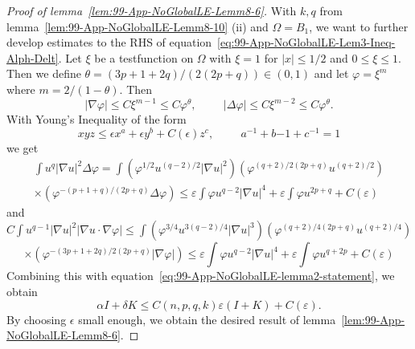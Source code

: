 \begin{proof}[Proof of lemma~\ref{lem:99-App-NoGlobalLE-Lemm8-6}]
	With $k,q$ from lemma~\ref{lem:99-App-NoGlobalLE-Lemm8-10} (ii) and $\Omega=B_1$, we want to further develop estimates to the RHS of equation~\eqref{eq:99-App-NoGlobalLE-Lem3-Ineq-Alph-Delt}.
	Let $\xi$ be a testfunction on $\Omega$ with $\xi=1$ for $|x|\leq 1/2$ and $0\leq\xi\leq1$. Then we define $\theta=(3p+1+2q)/(2(2p+q))\in(0,1)$ and let $\varphi=\xi^m$ where $m=2/(1-\theta)$. Then
	\begin{equation}
		\left|\nabla\varphi\right|\leq C\xi^{m-1}\leq C\varphi^{\theta},\hspace{1cm}|\Delta\varphi|\leq C\xi^{m-2}\leq C\varphi^{\theta}.
		\label{eq:99-App-NoGlobalLE-Lem4-Proof-i}
	\end{equation}
	With Young's Inequality of the form
	\begin{equation}
		xyz\leq\epsilon x^a+\epsilon y^b+ C(\epsilon)z^c,\hspace{1cm}a^{-1}+b{-1}+c^{-1}=1
		\label{eq:99-App-NoGlobalLE-Lem4-Proof-ii}
	\end{equation}
	we get
	\begin{equation}
		\begin{gathered}
		\int u^{q}|\nabla u|^{2} \Delta \varphi=\int\left(\varphi^{1 / 2} u^{(q-2) / 2}|\nabla u|^{2}\right)\left(\varphi^{(q+2) / 2(2 p+q)} u^{(q+2) / 2}\right) \\
		\times\left(\varphi^{-(p+1+q) /(2 p+q)} \Delta \varphi\right) \leq \varepsilon \int \varphi u^{q-2}|\nabla u|^{4}+\varepsilon \int \varphi u^{2 p+q}+C(\varepsilon)
		\end{gathered}
		\label{eq:99-App-NoGlobalLE-Lem4-Proofiii-1}
	\end{equation}
	and
	$C \int u^{q-1}|\nabla u|^{2}|\nabla u \cdot \nabla \varphi| \leq \int\left(\varphi^{3 / 4} u^{3(q-2) / 4}|\nabla u|^{3}\right)\left(\varphi^{(q+2) / 4(2 p+q)} u^{(q+2) / 4}\right)$
	\begin{equation}
	\times\left(\varphi^{-(3 p+1+2 q) / 2(2 p+q)}|\nabla \varphi|\right) \leq \varepsilon \int \varphi u^{q-2}|\nabla u|^{4}+\varepsilon \int \varphi u^{q+2 p}+C(\varepsilon)
	\label{eq:99-App-NoGlobalLE-Lem4-Proofiii-2}
	\end{equation}
	Combining this with equation~\eqref{eq:99-App-NoGlobalLE-lemma2-statement}, we obtain
	\begin{equation}
		\alpha I+\delta K \leq C(n, p, q, k) \varepsilon(I+K)+C(\varepsilon).
		\label{eq:99-App-NoGlobalLE-Lem4-Proofiii-3}
	\end{equation}
	By choosing $\epsilon$ small enough, we obtain the desired result of lemma~\ref{lem:99-App-NoGlobalLE-Lemm8-6}.
\end{proof}